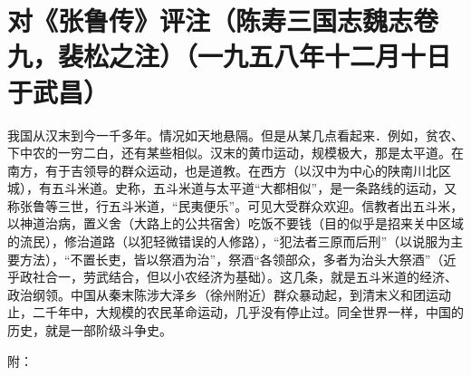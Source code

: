 \section[对《张鲁传》评注（陈寿三国志魏志卷九，裴松之注）（一九五八年十二月十日于武昌）]{对《张鲁传》评注（陈寿三国志魏志卷九，裴松之注）（一九五八年十二月十日于武昌）}


我国从汉末到今一千多年。情况如天地悬隔。但是从某几点看起来．例如，贫农、下中农的一穷二白，还有某些相似。汉末的黄巾运动，规模极大，那是太平道。在南方，有于吉领导的群众运动，也是道教。在西方（以汉中为中心的陕南川北区城），有五斗米道。史称，五斗米道与太平道“大都相似”，是一条路线的运动，又称张鲁等三世，行五斗米道，“民夷便乐”。可见大受群众欢迎。信教者出五斗米，以神道治病，置义舍（大路上的公共宿舍）吃饭不要钱（目的似乎是招来关中区域的流民），修治道路（以犯轻微错误的人修路），“犯法者三原而后刑”（以说服为主要方法），“不置长吏，皆以祭酒为治”，祭酒“各领部众，多者为治头大祭酒”（近乎政社合一，劳武结合，但以小农经济为基础）。这几条，就是五斗米道的经济、政治纲领。中国从秦末陈涉大泽乡（徐州附近）群众暴动起，到清末义和团运动止，二千年中，大规模的农民革命运动，几乎没有停止过。同全世界一样，中国的历史，就是一部阶级斗争史。

附：

